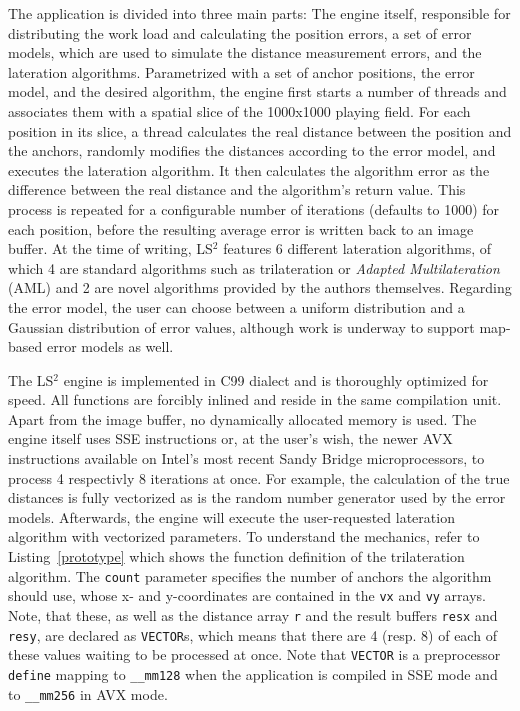 The application is divided into three main parts: The engine itself, responsible for distributing the work load and calculating the position errors, a set of error models, which are used to simulate the distance measurement errors, and the lateration algorithms. Parametrized with a set of anchor positions, the error model, and the desired algorithm, the engine first starts a number of threads and associates them with a spatial slice of the 1000x1000 playing field. For each position in its slice, a thread calculates the real distance between the position and the anchors, randomly modifies the distances according to the error model, and executes the lateration algorithm. It then calculates the algorithm error as the difference between the real distance and the algorithm's return value. This process is repeated for a configurable number of iterations (defaults to 1000) for each position, before the resulting average error is written back to an image buffer. At the time of writing, LS$^{2}$ features 6 different lateration algorithms, of which 4 are standard algorithms such as trilateration or \emph{Adapted Multilateration} (AML) and 2 are novel algorithms provided by the authors themselves. Regarding the error model, the user can choose between a uniform distribution and a Gaussian distribution of error values, although work is underway to support map-based error models as well.

The LS$^{2}$ engine is implemented in C99 dialect and is thoroughly optimized for speed. All functions are forcibly inlined and reside in the same compilation unit. Apart from the image buffer, no dynamically allocated memory is used. The engine itself uses SSE instructions or, at the user's wish, the newer AVX instructions available on Intel's most recent Sandy Bridge microprocessors, to process 4 respectivly 8 iterations at once. For example, the calculation of the true distances is fully vectorized as is the random number generator used by the error models. Afterwards, the engine will execute the user-requested lateration algorithm with vectorized parameters. To understand the mechanics, refer to Listing~\ref{prototype} which shows the function definition of the trilateration algorithm. The \texttt{count} parameter specifies the number of anchors the algorithm should use, whose x- and y-coordinates are contained in the \texttt{vx} and \texttt{vy} arrays. Note, that these, as well as the distance array \texttt{r} and the result buffers \texttt{resx} and \texttt{resy}, are declared as \texttt{VECTOR}s, which means that there are 4 (resp. 8) of each of these values waiting to be processed at once. Note that \texttt{VECTOR} is a preprocessor \texttt{define} mapping to \texttt{\_\_mm128} when the application is compiled in SSE mode and to \texttt{\_\_mm256} in AVX mode.

